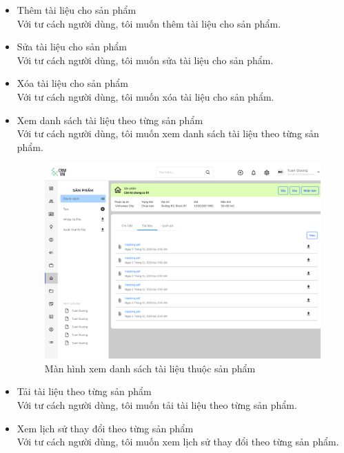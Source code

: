 \documentclass[12pt,a4paper]{article}
\begin{document}
\begin{enumerate}
\begin{itemize}
            \item Thêm tài liệu cho sản phẩm \\
            Với tư cách người dùng, tôi muốn thêm tài liệu cho sản phẩm.

            \item Sửa tài liệu cho sản phẩm \\
            Với tư cách người dùng, tôi muốn sửa tài liệu cho sản phẩm.

            \item Xóa tài liệu cho sản phẩm \\
            Với tư cách người dùng, tôi muốn xóa tài liệu cho sản phẩm.

            \item Xem danh sách tài liệu theo từng sản phẩm \\
            Với tư cách người dùng, tôi muốn xem danh sách tài liệu theo từng sản phẩm.
            \begin{figure}[H]
                \centering \includegraphics[width=\textwidth]{Img/Nguyet/Sanpham/tailieu.png}
                \vspace{0.5cm}
                \caption{Màn hình xem danh sách tài liệu thuộc sản phẩm }
                \label{tlsp}
            \end{figure}
            \item Tải tài liệu theo từng sản phẩm \\
            Với tư cách người dùng, tôi muốn tải tài liệu theo từng sản phẩm.

            \item Xem lịch sử thay đổi theo từng sản phẩm \\
            Với tư cách người dùng, tôi muốn xem lịch sử thay đổi theo từng sản phẩm.


\end{itemize}
\end{enumerate}
\end{document}
